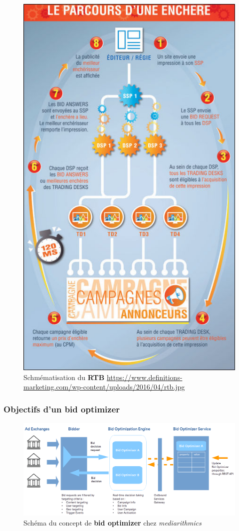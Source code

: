            \begin{figure}
                \centering
                \includegraphics[scale=0.3]{images/rtb.jpg}
                \caption{Schmématisation du \textbf{RTB} \url{https://www.definitions-marketing.com/wp-content/uploads/2016/04/rtb.jpg}}
            \end{figure}
        \subsubsection{Objectifs d'un bid optimizer}
            \begin{figure}
                \includegraphics[width=\linewidth]{images/bid-optimization-engine-and-bid-optimizer.png}
                \caption{Schéma du concept de \textbf{bid optimizer} chez \emph{mediarithmics}}
                \label{fig:bid-optimization}
            \end{figure}
